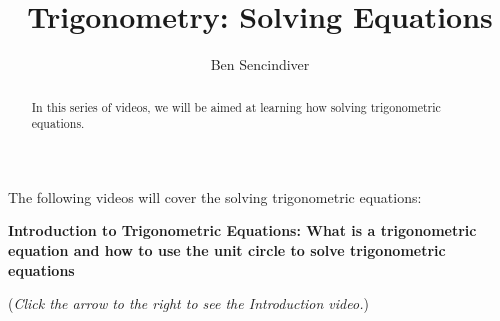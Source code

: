\documentclass{ximera}
\title[Prerequisite Videos: ]{Trigonometry: Solving Equations}
\author{Ben Sencindiver}
\begin{document}
\begin{abstract}
  In this series of videos, we will be aimed at learning how
  solving trigonometric equations.
\end{abstract}
\maketitle

The following videos will cover the solving trigonometric equations:

\textbf{Introduction to Trigonometric Equations: What is a trigonometric
equation and how to use the unit circle to solve trigonometric equations}
\begin{explanation}
\begin{flushright}
{\color{blue}(\emph{Click the arrow to the right to see the Introduction video.})}   
\end{flushright}
\begin{center}
\begin{expandable}
\end{expandable}
\end{center}
\end{explanation}
\end{document}
